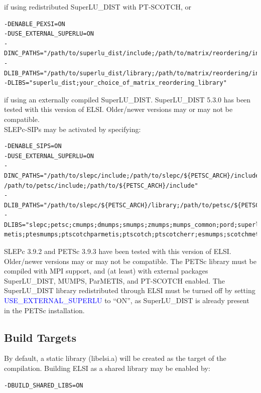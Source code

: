 \documentclass{report}
\begin{document}
if using redistributed SuperLU\_DIST with PT-SCOTCH, or\\

\begin{verbatim}
-DENABLE_PEXSI=ON
-DUSE_EXTERNAL_SUPERLU=ON
-DINC_PATHS="/path/to/superlu_dist/include;/path/to/matrix/reordering/include"
-DLIB_PATHS="/path/to/superlu_dist/library;/path/to/matrix/reordering/include"
-DLIBS="superlu_dist;your_choice_of_matrix_reordering_library"
\end{verbatim}

if using an externally compiled SuperLU\_DIST.  SuperLU\_DIST 5.3.0 has been tested with this version of ELSI.  Older/newer versions may or may not be compatible.\\

SLEPc-SIPs may be activated by specifying:\\

\begin{verbatim}
-DENABLE_SIPS=ON
-DUSE_EXTERNAL_SUPERLU=ON
-DINC_PATHS="/path/to/slepc/include;/path/to/slepc/${PETSC_ARCH}/include;
/path/to/petsc/include;/path/to/${PETSC_ARCH}/include"
-DLIB_PATHS="/path/to/slepc/${PETSC_ARCH}/library;/path/to/petsc/${PETSC_ARCH}/library"
-DLIBS="slepc;petsc;cmumps;dmumps;smumps;zmumps;mumps_common;pord;superlu_dist;parmetis;
metis;ptesmumps;ptscotchparmetis;ptscotch;ptscotcherr;esmumps;scotchmetis;scotch;scotcherr"
\end{verbatim}

SLEPc 3.9.2 and PETSc 3.9.3 have been tested with this version of ELSI.  Older/newer versions may or may not be compatible.  The PETSc library must be compiled with MPI support, and (at least) with external packages SuperLU\_DIST, MUMPS, ParMETIS, and PT-SCOTCH enabled.  The SuperLU\_DIST library redistributed through ELSI must be turned off by setting \textcolor{blue}{USE\_EXTERNAL\_SUPERLU} to ``ON'', as SuperLU\_DIST is already present in the PETSc installation.\\

\subsection{Build Targets}
\label{subsec:config_targets}
By default, a static library (libelsi.a) will be created as the target of the compilation.  Building ELSI as a shared library may be enabled by:\\

\begin{verbatim}
-DBUILD_SHARED_LIBS=ON
\end{verbatim}
\end{document}
